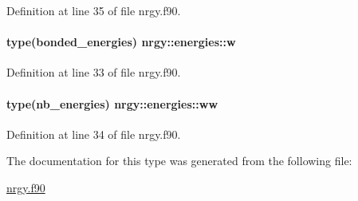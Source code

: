 Definition at line 35 of file nrgy.\-f90.

\hypertarget{structnrgy_1_1energies_a74c9c8861749056001bb7618310ce4e5}{
\paragraph[{w}]{\setlength{\rightskip}{0pt plus 5cm}type({\bf bonded\-\_\-energies}) nrgy\-::energies\-::w}}\label{structnrgy_1_1energies_a74c9c8861749056001bb7618310ce4e5}


Definition at line 33 of file nrgy.\-f90.

\hypertarget{structnrgy_1_1energies_a26d3929edff4f0828fea1b4aee6eb644}{
\paragraph[{ww}]{\setlength{\rightskip}{0pt plus 5cm}type({\bf nb\-\_\-energies}) nrgy\-::energies\-::ww}}\label{structnrgy_1_1energies_a26d3929edff4f0828fea1b4aee6eb644}


Definition at line 34 of file nrgy.\-f90.



The documentation for this type was generated from the following file\-:\begin{DoxyCompactItemize}
\item 
\hyperlink{nrgy_8f90}{nrgy.\-f90}\end{DoxyCompactItemize}
